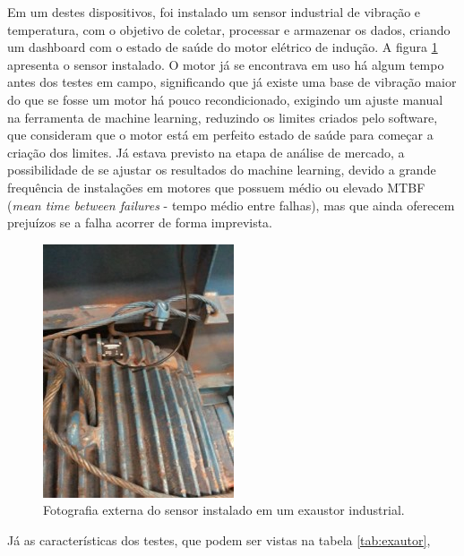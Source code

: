 Em um destes dispositivos, foi instalado um sensor industrial de vibração e temperatura, com o objetivo de coletar, processar e armazenar os
dados, criando um dashboard com o estado de saúde do motor elétrico de indução. A figura \ref{fig:sensor_exaustor} apresenta o sensor instalado.
O motor já se encontrava em uso há algum tempo antes dos testes em campo, significando que já existe uma base de vibração maior do que se fosse
um motor há pouco recondicionado, exigindo um ajuste manual na ferramenta de machine learning, reduzindo os limites criados pelo software, que
consideram que o motor está em perfeito estado de saúde para começar a criação dos limites. Já estava previsto na etapa de análise de mercado, 
a possibilidade de se ajustar os resultados do machine learning, devido a grande frequência de instalações em motores que possuem médio ou
elevado MTBF (\textit{mean time between failures} - tempo médio entre falhas), mas que ainda oferecem prejuízos se a falha acorrer de forma 
imprevista.

\begin{figure}[H]
    \caption{Fotografia externa do sensor instalado em um exaustor industrial.}
    \begin{center}
        \includegraphics[scale=1.1]{metodologia/img/sensor_exaustor.jpg}
    \end{center}
    \label{fig:sensor_exaustor}
\end{figure}

Já as características dos testes, que podem ser vistas na tabela \ref{tab:exautor}, 


